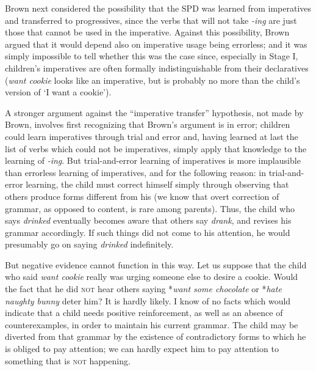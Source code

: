 Brown next considered the possibility that the SPD was learned from imperatives and transferred to progressives, since the verbs that will not take \textit{-ing} are just those that cannot be used in the imperative. Against this possibility, Brown argued that it would depend also on imperative usage being errorless; and it was simply impossible to tell whether this was the case since, especially in Stage I, children's impera\-tives are often formally indistinguishable from their declaratives (\textit{want cookie} looks like an imperative, but is probably no more than the child's version of `I want a cookie').

A stronger argument against the ``imperative transfer'' hypothesis,
not made by Brown, involves first recognizing that Brown's argument is in error; children could learn imperatives through trial and error and, having learned at last the list of verbs which could not be imperatives, simply apply that knowledge to the learning of \textit{-ing}. But trial-and-error learning of imperatives is more implausible than errorless learning of imperatives, and for the following reason: in trial-and-error learning, the child must correct himself simply through observing that others produce forms different from his (we know that overt correction of grammar, as opposed to content, is rare among parents). Thus, the child who says \textit{drinked} eventually becomes aware that others say \textit{drank}, and revises his grammar accordingly. If such things did not come to his attention, he would presumably go on saying \textit{drinked} indefinitely.

But negative evidence cannot function in this way. Let us sup\-pose that the child who said \textit{want cookie} really was urging someone else to desire a cookie. Would the fact that he did \textsc{not} hear others saying *\textit{want some chocolate} or *\textit{hate naughty bunny} deter him? It is hardly likely. I know of no facts which would indicate that a child needs positive reinforcement, as well as an absence of counterexamples, in order to maintain his current grammar. The child may be diverted from that grammar by the existence of contradictory forms to which he is obliged to pay attention; we can hardly expect him to pay atten\-tion to something that is \textsc{not} happening.

